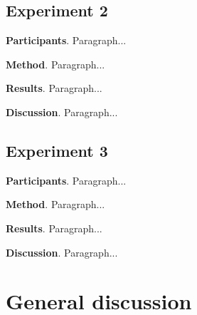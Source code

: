 \documentclass[10pt,letterpaper]{article}
\begin{document}
\subsection{Experiment 2}

\textbf{Participants}. Paragraph...

\textbf{Method}. Paragraph...

\textbf{Results}. Paragraph...

\textbf{Discussion}. Paragraph...

\subsection{Experiment 3}

\textbf{Participants}. Paragraph...

\textbf{Method}. Paragraph...

\textbf{Results}. Paragraph...

\textbf{Discussion}. Paragraph...

\section{General discussion}




\setlength{\bibleftmargin}{.125in}
\setlength{\bibindent}{-\bibleftmargin}


\end{document}
